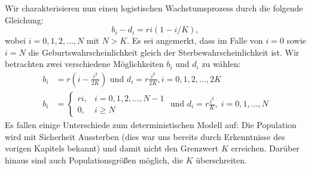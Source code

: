 \documentclass{article}
\begin{document}
Wir charakterisieren nun einen logistischen Wachstumsprozess durch die folgende Gleichung:
\[
  b_i-d_i = ri(1 - i/K),
\]
wobei $i = 0,1,2,\dots,N$ mit $N > K$. Es sei angemerkt, dass im Falle
von $i = 0$ sowie $i = N$ die
Geburtswahrscheinlichkeit gleich der Sterbewahrscheinlichkeit ist.
Wir betrachten zwei verschiedene Möglichkeiten $b_i$ und $d_i$ zu
wählen:
\begin{align}
  b_i &= r\left(i - \frac{i^2}{2K}\right) \text{ und } d_i =
          r\frac{i^2}{2K}, i = 0,1,2,\dots,2K \\
  b_i &= \begin{cases}
    ri,  &i = 0,1,2,\dots,N-1 \\
    0, &i \geq N
  \end{cases}
         \text{ und } d_i = r\frac{i^2}{K}, \; i = 0,1,\dots,N
\end{align}
Es fallen einige Unterschiede zum deterministischen Modell auf: Die
Population wird mit Sicherheit Aussterben (dies war uns bereits durch
Erkenntnisse des vorigen Kapitels bekannt) und damit nicht den
Grenzwert $K$ erreichen. Darüber hinaus sind auch Populationsgrößen möglich, die $K$ überschreiten.
\end{document}
